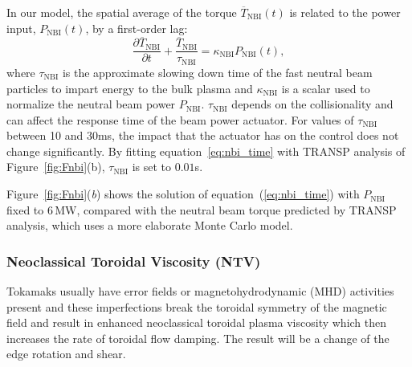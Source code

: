 \documentclass[12pt,lot, lof]{puthesis}
\begin{document}
In our model, the spatial average of the torque $\overline{T}_\text{NBI}(t)$ is
related to the power input, $P_\text{NBI}(t)$, by a first-order lag:
%
\begin{equation}
   \frac{\partial \overline{T}_\text{NBI}}{\partial t}
   + \frac{\overline{T}_\text{NBI}}{\tau_\text{NBI}}  = \kappa_\text{NBI} P_\text{NBI}(t),
   \label{eq:nbi_time}
\end{equation}
%
where $\tau_\text{NBI}$ is the approximate slowing down time of the fast neutral
beam particles to impart energy to the bulk plasma and $\kappa_\text{NBI}$ is a
scalar used to normalize the neutral beam power $P_\text{NBI}$.
%
$\tau_\text{NBI}$ depends on the collisionality and can affect the response time of the beam power actuator.
For values of $\tau_\text{NBI}$ between 10 and 30ms, the impact that the actuator has on the control does not change significantly.
By fitting equation~\eqref{eq:nbi_time} with TRANSP analysis of Figure~\ref{fig:Fnbi}(b),
$\tau_\text{NBI}$ is set to $0.01$s.

Figure~\ref{fig:Fnbi}(\emph{b}) shows the solution of
equation~(\ref{eq:nbi_time}) with $P_\text{NBI}$ fixed to 6\,MW, compared with
the neutral beam torque predicted by TRANSP analysis, which uses a more
elaborate Monte Carlo model.


\subsubsection{Neoclassical Toroidal Viscosity (NTV)}
 \label{TNTV}

Tokamaks usually have error fields or magnetohydrodynamic (MHD) activities present and these imperfections break the toroidal symmetry of the magnetic field and result in enhanced neoclassical toroidal plasma viscosity which then increases the rate of toroidal flow damping. The result will be a change of the edge rotation and shear. 
\end{document}
